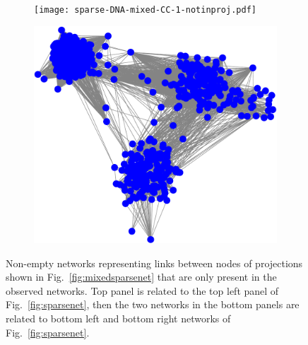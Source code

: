 \documentclass[10pt,a4paper]{article}
\begin{document}
\begin{figure}[h!]
\centering
\begin{subfigure}{0.4\textwidth}
\texttt{[image: sparse-DNA-mixed-CC-1-notinproj.pdf]}
\end{subfigure}
\begin{subfigure}{0.4\textwidth}
\includegraphics[width=\textwidth]{sparse-RNA-mixed-CC-1-notinproj.pdf}
\end{subfigure}
\caption{\label{fig:mixedsparsenetnotinproj} Non-empty networks representing links between nodes of projections shown in Fig.~\ref{fig:mixedsparsenet} that are only present in the observed networks. Top panel is related to the top left panel of Fig.~\ref{fig:sparsenet}, then the two networks in the bottom panels are related to bottom left and bottom right networks of Fig.~\ref{fig:sparsenet}.}
\end{figure}
\clearpage
\end{document}
